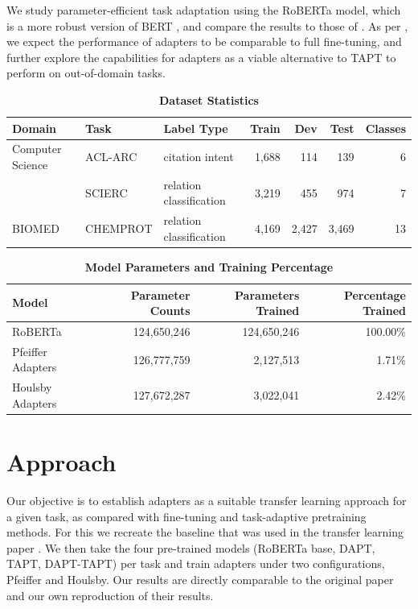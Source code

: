 \documentclass[draft,10pt,twocolumn,letterpaper]{article}
\begin{document}
We study parameter-efficient task adaptation using the RoBERTa model, which is a more robust version of BERT \cite{liu2019roberta}, and compare the results to those of \cite{gururangan2020dont}. As per \cite{houlsby2019parameter}, we expect the performance of adapters to be comparable to full fine-tuning, and further explore the capabilities for adapters as a viable alternative to TAPT to perform on out-of-domain tasks.

\begin{table}[h]
  \centering
  
  \begin{tabular}{ l l l r r r r }
    \hline
    \textbf{Domain} & \textbf{Task} & \textbf{Label Type} & \textbf{Train} & \textbf{Dev}   & \textbf{Test}  & \textbf{Classes} \\
    \hline
    Computer Science & ACL-ARC & citation intent & 1,688 & 114   & 139   & 6 \\
                     & SCIERC  & relation classification & 3,219 & 455   & 974   & 7 \\
    \hline
    BIOMED           & CHEMPROT & relation classification & 4,169 & 2,427 & 3,469 & 13 \\
    \hline
  \end{tabular}%
  \caption{\textbf{Dataset Statistics}}
  \label{tab:dataset-stats}%
\end{table}%


\begin{table}[h]
    \centering
    
    \begin{tabular}{ l r r r }
        \hline
        \textbf{Model} & \textbf{Parameter Counts} & \textbf{Parameters Trained} & \textbf{Percentage Trained} \\
        \hline
        RoBERTa & 124,650,246 & 124,650,246 & 100.00\% \\
        Pfeiffer Adapters & 126,777,759 & 2,127,513 & 1.71\% \\
        Houlsby Adapters & 127,672,287 & 3,022,041 & 2.42\% \\
        \hline
    \end{tabular}
    \caption{\textbf{Model Parameters and Training Percentage}}
    \label{tab:model-parameters}
\end{table}


\section{Approach}
Our objective is to establish adapters as a suitable transfer learning approach for a given task, as compared with fine-tuning and task-adaptive pretraining methods. For this we recreate the baseline that was used in the transfer learning paper \cite{gururangan2020dont}. We then take the four pre-trained models (RoBERTa base, DAPT, TAPT, DAPT-TAPT) per task and train adapters under two configurations, Pfeiffer and Houlsby. Our results are directly comparable to the original paper \cite{gururangan2020dont} and our own reproduction of their results.
\end{document}
